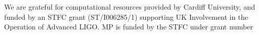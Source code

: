 \acknowledgements

We are grateful for computational resources provided by Cardiff University, and funded by an STFC grant (ST/I006285/1) supporting UK Involvement in
the Operation of Advanced LIGO. MP is funded by the STFC under grant number 